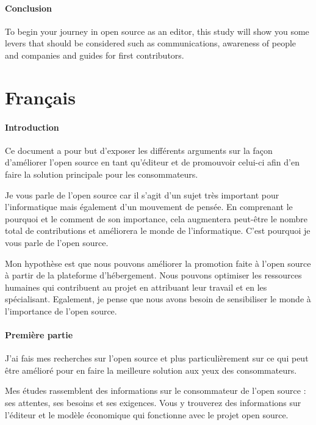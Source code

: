 	\paragraph*{Conclusion\\}

	To begin your journey in open source as an editor, this study will show you some levers that should be considered such as communications, awareness of people and companies and guides for first contributors.

\section*{Français}

	\paragraph*{Introduction\\}

	Ce document a pour but d'exposer les différents arguments sur la façon d'améliorer l'open source en tant qu'éditeur et de promouvoir celui-ci afin d'en faire la solution principale pour les consommateurs.

	Je vous parle de l'open source car il s'agit d'un sujet très important pour l'informatique mais également d'un mouvement de pensée.
	En comprenant le pourquoi et le comment de son importance, cela augmentera peut-être le nombre total de contributions et améliorera le monde de l'informatique. C'est pourquoi je vous parle de l'open source.

	Mon hypothèse est que nous pouvons améliorer la promotion faite à l'open source à partir de la plateforme d'hébergement. Nous pouvons optimiser les ressources humaines qui contribuent au projet en attribuant leur travail et en les spécialisant. Egalement, je pense que nous avons besoin de sensibiliser le monde à l'importance de l'open source.

	\paragraph*{Première partie\\}

	J'ai fais mes recherches sur l'open source et plus particulièrement sur ce qui peut être amélioré pour en faire la meilleure solution aux yeux des consommateurs.

	Mes études rassemblent des informations sur le consommateur de l'open source : ses attentes, ses besoins et ses exigences. Vous y trouverez des informations sur l'éditeur et le modèle économique qui fonctionne avec le projet open source.

